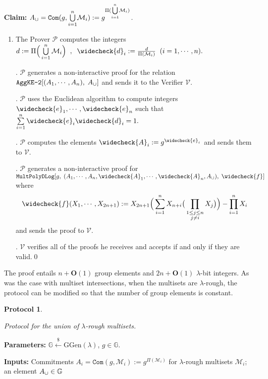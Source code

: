 \documentclass[11pt, lettersize, notitlepage, leqno, footskip=0.6cm]{article}
\newcommand{\pl}{\prod\limits}
\newcommand{\slim}{\sum\limits}
\newcommand{\ttt}{\texttt}
\newcommand{\mc}{\mathcal}
\newcommand{\mb}{\mathbb}
\newcommand{\mbf}{\mathbf}
\newcommand{\mr}{\mathrm}
\newcommand{\lam}{\lambda}
\newcommand{\lamb}{\lambda}
\newcommand{\weck}{\widecheck}
\newcommand{\bO}{\mbf{O}}
\newcommand{\mP}{\mc{P}}
\newcommand{\V}{\mc{V}}
\newcommand{\mcM}{\mc{M}}
\newcommand{\vs}{\vspace{-0.15cm}}
\newcommand{\noin}{\noindent}
\newtheorem{Prot}[Thm]{Protocol}
\numberwithin{equation}{section}
\begin{document}
\noin \textbf{Claim:} $A_{\tt{\cup}} = \protect{\verb|Com|}(g, {\bigcup\limits_{i=1}^n} \mc{M}_i) := g^{\Pi({\bigcup\limits_{i=1}^n} \mc{M}_i)}$. \vs

\begin{enumerate}[wide, labelwidth=!, labelindent=0pt]\vs \item The Prover $\mP$ computes the integers $d:= \Pi\Big(\bigcup\limits_{i=1}^n \mc{M}_i\Big)\;\;,\;\;\weck{d}_i:= \frac{d}{\Pi(\mcM_i)}\;\;(i=1,\cdots,n).$

\noin 2. $\mP$ generates a non-interactive proof for the relation $\ttt{AggKE-2}[(A_1,\cdots,A_n),\;A_{\tt{\cup}}]$ and sends it to the Verifier $\V$. 

\noin 3. $\mP$ uses the Euclidean algorithm to compute integers $\weck{e}_1,\cdots, \weck{e}_n$ such that $\slim_{i=1}^n \weck{e}_i\weck{d}_i = 1.$ \vs

\noin 4. $\mP$ computes the elements $\weck{A}_i:= g^{\weck{e}_i}$ and sends them to $\V$.

\noin 5. $\mP$ generates a non-interactive proof for $\ttt{MultPolyDLog}[g,\;(A_1,\cdots,A_n,\weck{A}_1,\cdots,\weck{A}_n,A_{\tt{\cup}}),\; \weck{f}]$ where \vs $$\weck{f}(X_1,\cdots,X_{2n+1}):= X_{2n+1}\Big(\slim_{i=1}^n X_{n+i}\big(\pl_{\substack{1\leq j\leq n\\ j\neq i}} X_{j}\big)\Big) - \pl_{i=1}^n X_i$$ and sends the proof to $\V$.

\noin 6. $\V$ verifies all of the proofs he receives and accepts if and only if they are valid.\qed \end{enumerate}


\noin The proof entails $n+\bO(1)$ group elements and $2n+\bO(1)$ $\lam$-bit integers. As was the case with multiset intersections, when the multisets are $\lam$-rough, the protocol can be modified so that the number of group elements is constant.

\vspace{0.1cm}

\begin{Prot} \hypertarget{Uni}{Protocol for the union of $\lam$-rough multisets.}\end{Prot} \vspace{-0.3cm}

\noin \textbf{Parameters:} $\mb{G}\xleftarrow{\$} \mr{GGen}(\lamb)$,\; $g\in \mb{G}$.

\noin \textbf{Inputs:} Commitments $A_i = \ttt{Com}(g, \mc{M}_i) := g^{\Pi(\mc{M}_i)}$ for $\lam$-rough multisets $\mc{M}_i$; an element $A_{\tt{\cup}}\in\mb{G}$
\end{document}
